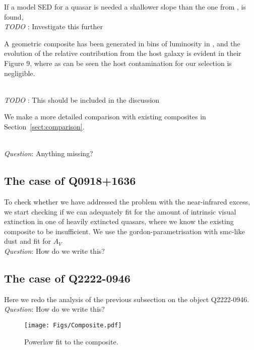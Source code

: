 \documentclass{aa}    %
\newcommand{\figlabel}[1]{\label{fig:#1}}
\newcommand{\sectionname}{Section}
\newcommand{\Sect}[1]{\sectionname~\ref{sect:#1}}
\newcommand{\sect}[1]{\Sect{#1}}
\newcommand{\sectlabel}[1]{\label{sect:#1}}
\newcommand{\todo}[3]{{\color{#2}\emph{#1}: #3}}
\newcommand{\jstodo}[1]{\todo{ \\TODO }{red}{#1}}
\newcommand{\qtodo}[1]{\todo{\\ Question}{red}{#1}}
\begin{document}
If a model SED for a quasar is needed a shallower slope than the one from \citep{VandenBerk2001}, is found, 
\jstodo{Investigate this further}


A geometric composite has been generated in bins of luminosity in \citep{Shen2011}, and the evolution of the relative contribution from the host galaxy is evident in their Figure 9, where as can be seen the host contamination for our selection is negligible.

\jstodo{This should be included in the discussion}

We make a more detailed comparison with existing composites in \sect{comparison}. 
 
 \qtodo{Anything missing?}




\subsection{The case of Q0918+1636}  \sectlabel{q0918}

To check whether we have addressed the problem
 with the near-infrared excess, we start checking if we can adequately fit for the amount of intrinsic visual extinction in one of heavily extincted quasars, where we know the existing composite to be insufficient. We use the gordon-parametrisation with smc-like dust and fit for $A_V$
 \qtodo{How do we write this?}
 
 \subsection{The case of Q2222-0946}  \sectlabel{q2222}

Here we redo the analysis of the previous subsection on the object Q2222-0946.
 \qtodo{How do we write this?}
 
 
  \begin{figure*}[hbtp]
    \centering
    \texttt{[image: Figs/Composite.pdf]}
    \caption[]{Powerlaw fit to the composite.}
    \figlabel{composite}
  \end{figure*}
 
\end{document}
